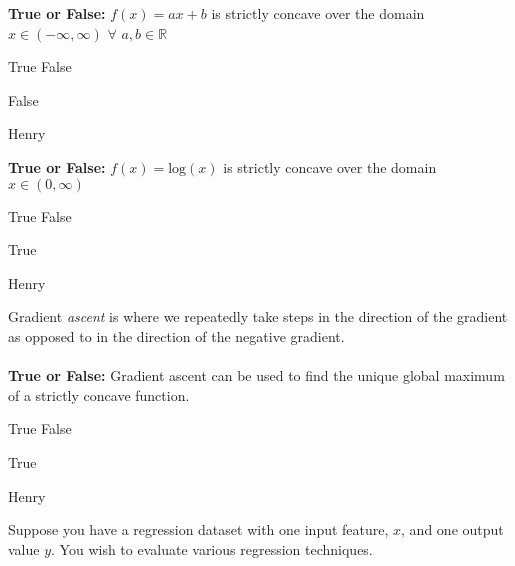 \begin{questions}
\begin{EnvFullwidth}
\end{EnvFullwidth}

\question[1] \textbf{True or False:} $f(x) = ax+b$ is strictly concave over the domain $x \in (-\infty, \infty)$ $\forall$ $a, b \in \mathbb{R}$
    \begin{checkboxes}
        \choice True 
        \choice False
    \end{checkboxes}
    \begin{soln}
       False
    \end{soln}
    \begin{qauthor}
        Henry
    \end{qauthor}
    
\question[1] \textbf{True or False:} $f(x) = \textrm{log}(x)$ is strictly concave over the domain $ x\in (0,\infty)$
    \begin{checkboxes}
        \choice True 
        \choice False
    \end{checkboxes}
    \begin{soln}
       True
    \end{soln}
    \begin{qauthor}
        Henry
    \end{qauthor}


\question[1] Gradient \emph{ascent} is where we repeatedly take steps in the direction of the gradient as opposed to in the direction of the negative gradient.
\\
\\
\textbf{True or False:} Gradient ascent can be used to find the unique global maximum of a strictly concave function.
    \begin{checkboxes}
        \choice True 
        \choice False
    \end{checkboxes}
    \begin{soln}
       True
    \end{soln}
    \begin{qauthor}
        Henry
    \end{qauthor}  
    
\clearpage

\question Suppose you have a regression dataset with one input feature, $x$, and one output value $y$. You wish to evaluate various regression techniques.

\end{questions}
